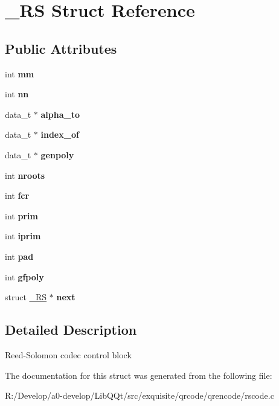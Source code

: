 \hypertarget{struct___r_s}{}\section{\+\_\+\+RS Struct Reference}
\label{struct___r_s}
\subsection*{Public Attributes}
\begin{DoxyCompactItemize}
\item 
\mbox{\label{struct___r_s_a046c7e4ece716d243101048247f6cde4}} 
int {\bfseries mm}
\item 
\mbox{\label{struct___r_s_ab5663729b99e9ff8f7969e916fda2627}} 
int {\bfseries nn}
\item 
\mbox{\label{struct___r_s_a998f0e035861187dd6fbef37ca5789ac}} 
data\+\_\+t $\ast$ {\bfseries alpha\+\_\+to}
\item 
\mbox{\label{struct___r_s_af3406fa5684f5c96c2cd523522959c47}} 
data\+\_\+t $\ast$ {\bfseries index\+\_\+of}
\item 
\mbox{\label{struct___r_s_aa6785d02605d937bcb035e62936cc245}} 
data\+\_\+t $\ast$ {\bfseries genpoly}
\item 
\mbox{\label{struct___r_s_a97be3a013ef02a581029d8219993ec2e}} 
int {\bfseries nroots}
\item 
\mbox{\label{struct___r_s_ab9c03761dfc23661efaeba22fb60fc96}} 
int {\bfseries fcr}
\item 
\mbox{\label{struct___r_s_a3e5a578b2322c98c7fc5bab914917b24}} 
int {\bfseries prim}
\item 
\mbox{\label{struct___r_s_af0655eabb9315ddd69493cf9e476bcb8}} 
int {\bfseries iprim}
\item 
\mbox{\label{struct___r_s_a10c7fe66a2d97af43c41881c5c24ce92}} 
int {\bfseries pad}
\item 
\mbox{\label{struct___r_s_ac8de531510e63159386f598575425c54}} 
int {\bfseries gfpoly}
\item 
\mbox{\label{struct___r_s_a8399f3b5c7fdcad97fab3f699c9e676b}} 
struct \mbox{\hyperlink{struct___r_s}{\+\_\+\+RS}} $\ast$ {\bfseries next}
\end{DoxyCompactItemize}


\subsection{Detailed Description}
Reed-\/\+Solomon codec control block 

The documentation for this struct was generated from the following file\+:\begin{DoxyCompactItemize}
\item 
R\+:/\+Develop/a0-\/develop/\+Lib\+Q\+Qt/src/exquisite/qrcode/qrencode/rscode.\+c\end{DoxyCompactItemize}
